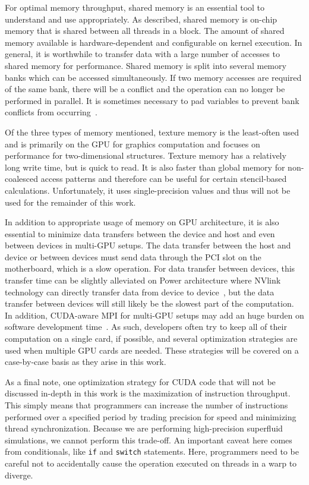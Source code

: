 For optimal memory throughput, shared memory is an essential tool to understand and use appropriately.
As described, shared memory is on-chip memory that is shared between all threads in a block.
The amount of shared memory available is hardware-dependent and configurable on kernel execution.
In general, it is worthwhile to transfer data with a large number of accesses to shared memory for performance.
Shared memory is split into several memory banks which can be accessed simultaneously.
If two memory accesses are required of the same bank, there will be a conflict and the operation can no longer be performed in parallel.
It is sometimes necessary to pad variables to prevent bank conflicts from occurring~\cite{harris2013}.

Of the three types of memory mentioned, texture memory is the least-often used and is primarily on the GPU for graphics computation and focuses on performance for two-dimensional structures.
Texture memory has a relatively long write time, but is quick to read.
It is also faster than global memory for non-coalesced access patterns and therefore can be useful for certain stencil-based calculations.
Unfortunately, it uses single-precision values and thus will not be used for the remainder of this work.

In addition to appropriate usage of memory on GPU architecture, it is also essential to minimize data transfers between the device and host and even between devices in multi-GPU setups.
The data transfer between the host and device or between devices must send data through the PCI slot on the motherboard, which is a slow operation.
For data transfer between devices, this transfer time can be slightly alleviated on Power architecture where NVlink technology can directly transfer data from device to device~\cite{foley2017}, but the data transfer between devices will still likely be the slowest part of the computation.
In addition, CUDA-aware MPI for multi-GPU setups may add an huge burden on software development time~\cite{lonvcar2016, wang2013}.
As such, developers often try to keep all of their computation on a single card, if possible, and several optimization strategies are used when multiple GPU cards are needed.
These strategies will be covered on a case-by-case basis as they arise in this work.

As a final note, one optimization strategy for CUDA code that will not be discussed in-depth in this work is the maximization of instruction throughput.
This simply means that programmers can increase the number of instructions performed over a specified period by trading precision for speed and minimizing thread synchronization.
Because we are performing high-precision superfluid simulations, we cannot perform this trade-off.
An important caveat here comes from conditionals, like \texttt{if} and \texttt{switch} statements.
Here, programmers need to be careful not to accidentally cause the operation executed on threads in a warp to diverge.

